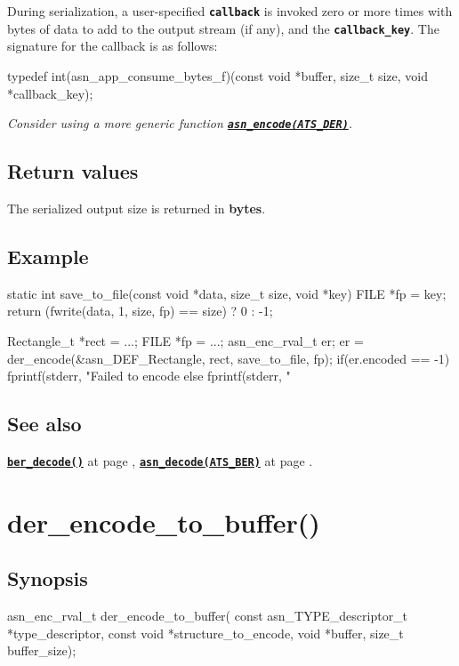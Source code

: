 \documentclass[english,oneside,12pt]{book}
\newcommand{\apisection}[2]{\clearpage\section{\label{#1}#2}}
\newcommand{\api}[2]{\hyperref[#1]{\code{#2}}}
\newcommand{\seealso}[2]{\api{#1}{#2} at page \pageref{#1}}
\newcommand{\code}[1]{\texttt{\textbf{\lstinline{#1}}}}
\begin{document}
During serialization, a user-specified \code{callback} is invoked zero
or more times with bytes of data to add to the output stream (if any), and
the \code{callback_key}. The signature for the callback is as follows:

\begin{signature}
typedef int(asn_app_consume_bytes_f)(const void *buffer, size_t size, void *callback_key);
\end{signature}

\noindent\emph{Consider using a more generic function \api{sec:asn_encode}{asn_encode(ATS_DER)}.}

\subsection*{Return values}


The serialized output size is returned in \textbf{bytes}.

\subsection*{Example}
\begin{example}
static int
save_to_file(const void *data, size_t size, void *key) {
    FILE *fp = key;
    return (fwrite(data, 1, size, fp) == size) ? 0 : -1;
}

Rectangle_t *rect = ...;
FILE *fp = ...;
asn_enc_rval_t er;
er = der_encode(&asn_DEF_Rectangle, rect, save_to_file, fp);
if(er.encoded == -1) {
   fprintf(stderr, "Failed to encode %
} else {
   fprintf(stderr, "%
}
\end{example}

\subsection*{See also}
\seealso{sec:ber_decode}{ber_decode()},
\seealso{sec:asn_decode}{asn_decode(ATS_BER)}.

\apisection{sec:der_encode_to_buffer}{der\_encode\_to\_buffer()}

\subsection*{Synopsis}

\begin{signature}
asn_enc_rval_t der_encode_to_buffer(
    const asn_TYPE_descriptor_t *type_descriptor,
    const void *structure_to_encode,
    void *buffer, size_t buffer_size);
\end{signature}
\end{document}
